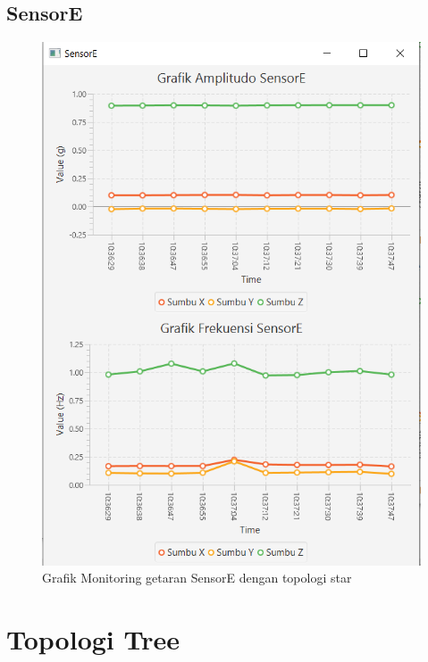 \subsection{SensorE}
\begin{figure}[H] 
	\centering  
	\includegraphics[scale=1]{Lampiran/HasilPengujian/sensorE_starRooftop2.PNG} 
	\caption[Grafik Monitoring getaran SensorE dengan topologi star]{Grafik Monitoring getaran SensorE dengan topologi star}
	\label{fig:grafik_E_star_rooftop} 
\end{figure}

\section{Topologi Tree}

